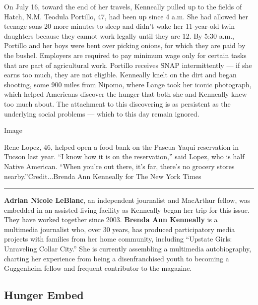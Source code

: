 On July 16, toward the end of her travels, Kenneally pulled up to the
fields of Hatch, N.M. Teodula Portillo, 47, had been up since 4 a.m. She
had allowed her teenage sons 20 more minutes to sleep and didn't wake
her 11-year-old twin daughters because they cannot work legally until
they are 12. By 5:30 a.m., Portillo and her boys were bent over picking
onions, for which they are paid by the bushel. Employers are required to
pay minimum wage only for certain tasks that are part of agricultural
work. Portillo receives SNAP intermittently --- if she earns too much,
they are not eligible. Kenneally knelt on the dirt and began shooting,
some 900 miles from Nipomo, where Lange took her iconic photograph,
which helped Americans discover the hunger that both she and Kenneally
knew too much about. The attachment to this discovering is as persistent
as the underlying social problems --- which to this day remain ignored.

Image

Rene Lopez, 46, helped open a food bank on the Pascua Yaqui reservation
in Tucson last year. ``I know how it is on the reservation,'' said
Lopez, who is half Native American. ``When you're out there, it's far,
there's no grocery stores nearby.''Credit...Brenda Ann Kenneally for The
New York Times

\begin{center}\rule{0.5\linewidth}{\linethickness}\end{center}

\textbf{Adrian Nicole LeBlanc}, an independent journalist and MacArthur
fellow, was embedded in an assisted-living facility as Kenneally began
her trip for this issue. They have worked together since 2003.
\textbf{Brenda Ann Kenneally} is a multimedia journalist who, over 30
years, has produced participatory media projects with families from her
home community, including ``Upstate Girls: Unraveling Collar City.'' She
is currently assembling a multimedia autobiography, charting her
experience from being a disenfranchised youth to becoming a Guggenheim
fellow and frequent contributor to the magazine.

\hypertarget{hunger-embed-1}{%
\subsection{Hunger Embed}\label{hunger-embed-1}}

\href{https://www.nytimes3xbfgragh.onion/interactive/2020/09/02/magazine/food-insecurity-hunger-us.html}{}

